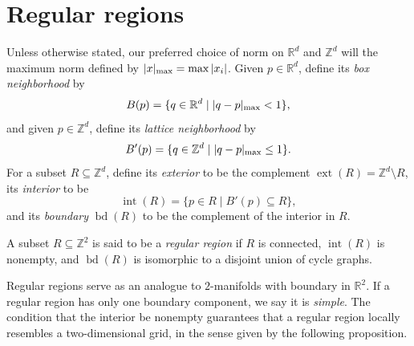\section{Regular regions}\label{sec:basics}

Unless otherwise stated, our preferred choice of norm on $\mathbb{R}^d$ and $\mathbb{Z}^d$ will the maximum norm defined by $|x|_{\rm max} = \max |x_i|$.
Given $p \in \mathbb{R}^d$, define its \emph{box neighborhood} by
\begin{equation}
  B(p) = \{q \in \mathbb{R}^d \mid |q - p|_{\rm max} < 1 \},
\end{equation}
and given  $p \in \mathbb{Z}^d$, define its \emph{lattice neighborhood} by
\begin{equation}
  B'(p) = \{q \in \mathbb{Z}^d \mid |q - p|_{\rm max} \leq 1 \}.
\end{equation}
For a subset $R \subseteq \mathbb{Z}^d$, define its \emph{exterior} to be the complement $\operatorname{ext}(R) = \mathbb{Z}^d \setminus R$, its \emph{interior} to be
\begin{equation}
  \operatorname{int}(R) = \{p \in R \mid B'(p) \subseteq R \},
\end{equation}
and its \emph{boundary} $\operatorname{bd}(R)$ to be the complement of the interior in $R$.

\begin{definition}
  A subset $R \subseteq \mathbb{Z}^2$ is said to be a \emph{regular region} if $R$ is connected, $\operatorname{int}(R)$ is nonempty, and $\operatorname{bd}(R)$ is isomorphic to a disjoint union of cycle graphs.
\end{definition}

Regular regions serve as an analogue to $2$-manifolds with boundary in $\mathbb{R}^2$.
If a regular region has only one boundary component, we say it is \emph{simple}.
The condition that the interior be nonempty guarantees that a regular region locally resembles a two-dimensional grid, in the sense given by the following proposition.

